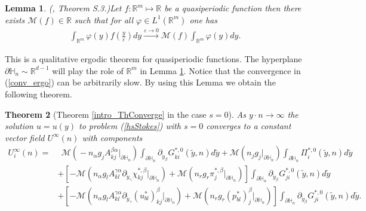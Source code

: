 \documentclass[11pt, reqno]{amsart}
\newtheorem{theorem}{Theorem}[section]
\newtheorem{lemma}[theorem]{Lemma}
\theoremstyle{definition}
\theoremstyle{remark}
\numberwithin{equation}{section}
\begin{document}
	\begin{lemma}\textup{(\cite{thm_ergo}, Theorem S.3.)}\label{ergodicity}
		Let $f:\mathbb{R}^m\longmapsto \mathbb{R}$ be a quasiperiodic function then there exists $\mathcal{M}(f)\in \mathbb{R}$ such that for all $\varphi \in L^1(\mathbb{R}^m)$ one has
		\begin{align}\label{conv_ergo}
			\int_{\mathbb{R}^m} \varphi (y) f\left( \frac{y}{\varepsilon}\right)dy \xrightarrow{\varepsilon \rightarrow 0}\mathcal{M}(f)\int_{\mathbb{R}^m} \varphi (y)  dy.
		\end{align}
	\end{lemma}
	\noindent	This is a qualitative ergodic theorem for quasiperiodic functions. The hyperplane $\partial\mathbb{H}_n \sim \mathbb{R}^{d-1}$ will play the role of $\mathbb{R}^m$ in  Lemma \ref{ergodicity}. Notice that the convergence in (\ref{conv_ergo})   can be arbitrarily slow. By using  this Lemma we obtain the following theorem.
	\begin{theorem}[Theorem \ref{intro_ThConverge} in the case $s=0$]\label{Thm_s=0}
		As $y\cdot n \rightarrow \infty$	the solution $u=u(y)$ to problem \textup{(\ref{hsStokes})} with $s=0$ converges to a constant vector field $U^{\infty}(n)$ with components
		\begin{align}
			U_i^{\infty}(n)
			=&\:\:	 \mathcal{M} \left(\! - n_\alpha g_j A^{\beta\alpha}_{kj} |_{\partial\mathbb{H}_n} \! \right)\!\!\int_{\partial\mathbb{H}_n}\!\! \partial_{\tilde{y}_\beta} G^{*,0}_{ki} \left(\tilde{y},n\right) d\tilde{y}+  \mathcal{M} \left( n_j g_j|_{\partial\mathbb{H}_n} \right)\!\!\int_{\partial\mathbb{H}_n}\!\!\! \Pi^{*,0}_i\left(\tilde{y},n\right) d\tilde{y}\nonumber\\
			&+\left[-\mathcal{M}(n_\alpha g_l A^{\gamma\alpha}_{kl}\partial_{ \tilde{y}_\gamma}  \chi_{kj}^{*,\beta}|_{\partial\mathbb{H}_n}) + \mathcal{M}\left( n_r g_r \pi_{j}^{*,\beta} |_{\partial\mathbb{H}_n} \right) \right]\!
			\int_{\partial\mathbb{H}_n}\!\!\partial_{\tilde{y}_\beta} G^{*,0}_{ji}(\tilde{y},n) d\tilde{y} \nonumber\\
			&+ \left[ -\mathcal{M}(n_\alpha g_l A^{\gamma\alpha}_{kl}\partial_{ \tilde{y}_\gamma} (u^*_{bl})^{\beta}_{kj} |_{\partial\mathbb{H}_n})+
			\mathcal{M}\left( n_r g_r (p^*_{bl})^{\beta}_{j} |_{\partial\mathbb{H}_n} \right) \right]
			\int_{\partial\mathbb{H}_n}  \partial_{\tilde{y}_\beta}G^{*,0}_{ji}(\tilde{y},n) d\tilde{y}.\label{formul_bltail}
		\end{align}	
	\end{theorem}
	
\end{document}
